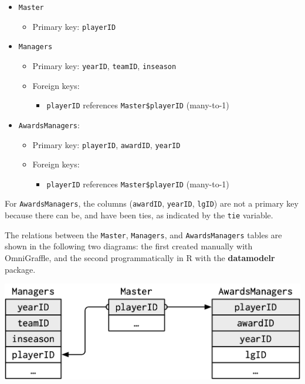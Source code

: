 \documentclass[]{book}
\providecommand{\tightlist}{%
  \setlength{\itemsep}{0pt}\setlength{\parskip}{0pt}}
\theoremstyle{plain}
\theoremstyle{remark}
\begin{document}
\begin{itemize}
\item
  \texttt{Master}

  \begin{itemize}
  \tightlist
  \item
    Primary key: \texttt{playerID}
  \end{itemize}
\item
  \texttt{Managers}

  \begin{itemize}
  \item
    Primary key: \texttt{yearID}, \texttt{teamID}, \texttt{inseason}
  \item
    Foreign keys:

    \begin{itemize}
    \tightlist
    \item
      \texttt{playerID} references \texttt{Master\$playerID} (many-to-1)
    \end{itemize}
  \end{itemize}
\item
  \texttt{AwardsManagers}:

  \begin{itemize}
  \item
    Primary key: \texttt{playerID}, \texttt{awardID}, \texttt{yearID}
  \item
    Foreign keys:

    \begin{itemize}
    \tightlist
    \item
      \texttt{playerID} references \texttt{Master\$playerID} (many-to-1)
    \end{itemize}
  \end{itemize}
\end{itemize}

For \texttt{AwardsManagers}, the columns (\texttt{awardID}, \texttt{yearID}, \texttt{lgID}) are not a primary
key because there can be, and have been ties, as indicated by the \texttt{tie} variable.

The relations between the \texttt{Master}, \texttt{Managers}, and \texttt{AwardsManagers} tables
are shown in the following two diagrams: the first created manually with OmniGraffle,
and the second programmatically in R with the \textbf{datamodelr} package.

\begin{center}\includegraphics[width=14.21in]{diagrams/Lahman2} \end{center}
\end{document}
